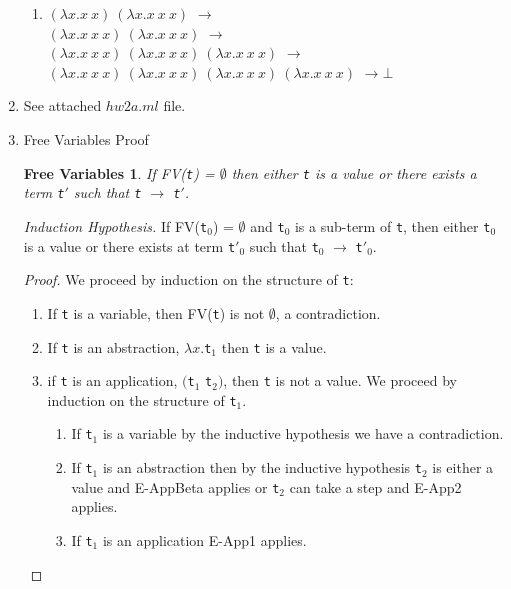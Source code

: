 \documentclass{article}
\newtheorem{free}{Free Variables}
\begin{document}
\begin{enumerate}
\begin{enumerate}
    \item $(\lambda x.x\ x)\ (\lambda x.x\ x\ x)$ $\longrightarrow$ \\
      $(\lambda x.x\ x\ x)\ (\lambda x.x\ x\ x)$ $\longrightarrow$ \\
      $(\lambda x.x\ x\ x)\ (\lambda x.x\ x\ x)\ (\lambda x.x\ x\ x)$
      $\longrightarrow$ \\
      $(\lambda x.x\ x\ x)\ (\lambda x.x\ x\ x)\ (\lambda x.x\ x\ x)\ (\lambda x.x\ x\ x)$ $\longrightarrow
      \bot$


    \end{enumerate}

  \item{See attached $hw2a.ml$ file.}

  \item{Free Variables Proof}
    \begin{free}
      If FV(\verb|t|) = $\emptyset$ then either \verb|t| is a value or there exists a term \verb|t|$'$ such that \verb|t| $\longrightarrow$ \verb|t|$'$.
    \end{free}

    \textit{Induction Hypothesis.} If FV(\verb|t|$_0$) = $\emptyset$ and \verb|t|$_0$ is a sub-term of \verb|t|, then either \verb|t|$_0$ is a value or there exists at term \verb|t|$'_0$ such that \verb|t|$_0$ $\longrightarrow$ \verb|t|$'_0$.


    \begin{proof}
      We proceed by induction on the structure of \verb|t|:
      \begin{enumerate}
      \item If \verb|t| is a variable, then FV(\verb|t|) is not $\emptyset$, a contradiction.
      \item If \verb|t| is an abstraction, $\lambda x.$\verb|t|$_1$ then \verb|t| is a value.
      \item if \verb|t| is an application, $($\verb|t|$_1$ \verb|t|$_2)$, then \verb|t| is not a value. We proceed by induction on the structure of \verb|t|$_1$.
        \begin{enumerate}
        \item If \verb|t|$_1$ is a variable by the inductive hypothesis we have a contradiction.
        \item If \verb|t|$_1$ is an abstraction then by the inductive hypothesis \verb|t|$_2$ is either a value and E-AppBeta applies or \verb|t|$_2$ can take a step and E-App2 applies.
        \item If \verb|t|$_1$ is an application E-App1 applies.
        \end{enumerate}
      \end{enumerate}
    \end{proof}


\end{enumerate}
\end{document}
